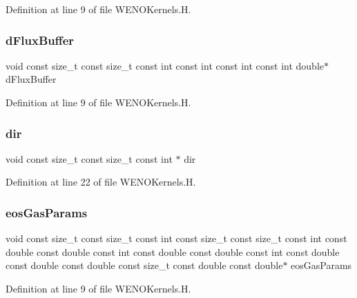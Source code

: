 Definition at line 9 of file W\+E\+N\+O\+Kernels.\+H.

\hypertarget{WENOKernels_8H_a2d1f37d2aa66a6c55c41d8f4d340ad1b}{}\label{WENOKernels_8H_a2d1f37d2aa66a6c55c41d8f4d340ad1b} 
\subsubsection{\texorpdfstring{d\+Flux\+Buffer}{dFluxBuffer}}
{\footnotesize\ttfamily void const size\+\_\+t const size\+\_\+t const int const int const int const int double$\ast$ d\+Flux\+Buffer}



Definition at line 9 of file W\+E\+N\+O\+Kernels.\+H.

\hypertarget{WENOKernels_8H_ac055ecf2f0c28b4f3676d05314d9840c}{}\label{WENOKernels_8H_ac055ecf2f0c28b4f3676d05314d9840c} 
\subsubsection{\texorpdfstring{dir}{dir}}
{\footnotesize\ttfamily void const size\+\_\+t const size\+\_\+t const int $\ast$ dir}



Definition at line 22 of file W\+E\+N\+O\+Kernels.\+H.

\hypertarget{WENOKernels_8H_ae3d0a391e4050ddaf66a42b2596fa3cd}{}\label{WENOKernels_8H_ae3d0a391e4050ddaf66a42b2596fa3cd} 
\subsubsection{\texorpdfstring{eos\+Gas\+Params}{eosGasParams}}
{\footnotesize\ttfamily void const size\+\_\+t const size\+\_\+t const int const size\+\_\+t const size\+\_\+t const int const double const double const int const double const double const int const double const double const double const size\+\_\+t const double const double$\ast$ eos\+Gas\+Params}



Definition at line 9 of file W\+E\+N\+O\+Kernels.\+H.

